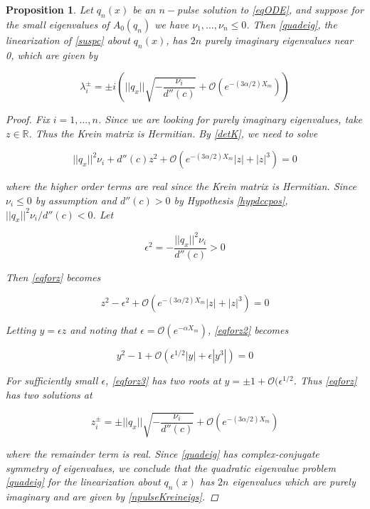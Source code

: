 \documentclass[12pt]{article}
\def\R{{\mathbb R}}
\newtheorem{proposition}{Proposition}
\begin{document}
\begin{proposition}
Let $q_n(x)$ be an $n-$pulse solution to \eqref{eqODE}, and suppose for the small eigenvalues of $A_0(q_n)$ we have $\nu_1, \dots, \nu_n \leq 0$. Then \eqref{quadeig}, the linearization of \eqref{suspc} about $q_n(x)$, has $2n$ purely imaginary eigenvalues near 0, which are given by

\begin{equation}\label{npulseKreineigs}
\lambda_i^\pm = \pm i \left( ||q_x|| \sqrt{ -\frac{ \nu_i}{d''(c)} } + \mathcal{O}(e^{-(3 \alpha/2) X_m}) \right)
\end{equation}

\begin{proof}
Fix $i = 1, \dots, n$. Since we are looking for purely imaginary eigenvalues, take $z \in \R$. Thus the Krein matrix is Hermitian. By \eqref{detK}, we need to solve

\begin{equation}\label{eqforz}
||q_x||^2 \nu_i + d''(c) z^2 + \mathcal{O}(e^{-(3 \alpha/2) X_m}|z| + |z|^3) = 0
\end{equation}

where the higher order terms are real since the Krein matrix is Hermitian. Since $\nu_i \leq 0$ by assumption and $d''(c) > 0$ by Hypothesis \ref{hypdccpos}, $||q_x||^2 \nu_i / d''(c) < 0$. Let

\begin{equation}
\epsilon^2 = -\frac{||q_x||^2 \nu_i}{d''(c)} > 0
\end{equation}

Then \eqref{eqforz} becomes

\begin{equation}\label{eqforz2}
z^2 - \epsilon^2 + \mathcal{O}(e^{-(3 \alpha/2) X_m}|z| + |z|^3) = 0
\end{equation}

Letting $y = \epsilon z$ and noting that $\epsilon = \mathcal{O}(e^{-\alpha X_m})$, \eqref{eqforz2} becomes

\begin{equation}\label{eqforz3}
y^2 - 1 + \mathcal{O}(\epsilon^{1/2 }|y| + \epsilon|y^3|) = 0
\end{equation}

For sufficiently small $\epsilon$, \eqref{eqforz3} has two roots at $y = \pm 1 + \mathcal{O}(\epsilon^{1/2}$. Thus \eqref{eqforz} has two solutions at

\begin{equation}
z_i^\pm = \pm ||q_x|| \sqrt{ -\frac{ \nu_i}{d''(c)} } + \mathcal{O}(e^{-(3 \alpha/2) X_m})
\end{equation}

where the remainder term is real. Since \eqref{quadeig} has complex-conjugate symmetry of eigenvalues, we conclude that the quadratic eigenvalue problem \eqref{quadeig} for the linearization about $q_n(x)$ has $2n$ eigenvalues which are purely imaginary and are given by \eqref{npulseKreineigs}.

\end{proof}
\end{proposition}
\end{document}
